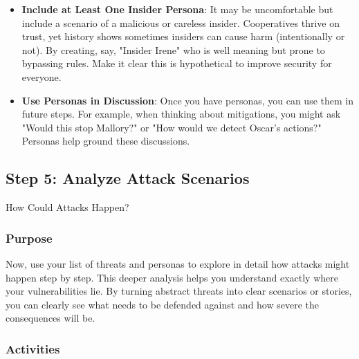 \begin{itemize}
    \item \textbf{Include at Least One Insider Persona}: It may be uncomfortable but include a scenario of a malicious or
    careless insider. Cooperatives thrive on trust, yet history shows sometimes insiders can cause harm (intentionally
    or not). By creating, say, "Insider Irene" who is well meaning but prone to bypassing rules.
    Make it clear this is hypothetical to improve security for everyone.
    
    \item \textbf{Use Personas in Discussion}: Once you have personas, you can use them in future steps. For example, when
    thinking about mitigations, you might ask "Would this stop Mallory?" or "How would we detect Oscar's actions?"
    Personas help ground these discussions.
\end{itemize}

\subsection{Step 5: Analyze Attack Scenarios}
\label{subsec:Step5}

How Could Attacks Happen?

\subsubsection{Purpose}

Now, use your list of threats and personas to explore in detail how attacks
might happen step by step. This deeper analysis helps you understand exactly
where your vulnerabilities lie. By turning abstract threats into clear scenarios
or stories, you can clearly see what needs to be defended against and how severe
the consequences will be.

\subsubsection{Activities}

